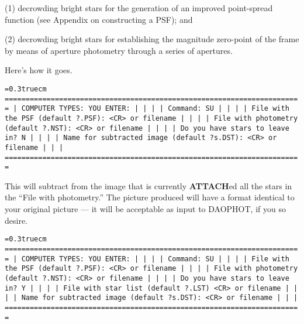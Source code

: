 \item{(1)} decrowding bright stars for the generation of an improved
point-spread function (see Appendix on constructing a PSF); and

\item{(2)} decrowding bright stars for establishing the magnitude
zero-point of the frame by means of aperture photometry through a
series of apertures.  

Here's how it goes.

\bigskip
{\noindent\obeylines\obeyspaces\frenchspacing\tt\baselineskip=0.3truecm
=======================================================================
| COMPUTER TYPES:                                  YOU ENTER:         |
|                                                                     |
| Command:                                         SU                 |
|                                                                     |
|             File with the PSF (default ?.PSF):   <CR> or filename   |
|                                                                     |
|          File with photometry (default ?.NST):   <CR> or filename   |
|                                                                     |
|                Do you have stars to leave in?    N                  |
|                                                                     |
|    Name for subtracted image (default ?s.DST):   <CR> or filename   |
|                                                                     |
=======================================================================
} 
\bigskip 

\noindent This will subtract from the image that is currently {\bf
ATTACH}ed all the stars in the ``File with photometry.''  The picture
produced will have a format identical to your original picture --- it
will be acceptable as input to DAOPHOT, if you so desire.

\vfill
\eject
{\noindent\obeylines\obeyspaces\frenchspacing\tt\baselineskip=0.3truecm
=======================================================================
| COMPUTER TYPES:                                  YOU ENTER:         |
|                                                                     |
| Command:                                         SU                 |
|                                                                     |
|             File with the PSF (default ?.PSF):   <CR> or filename   |
|                                                                     |
|          File with photometry (default ?.NST):   <CR> or filename   |
|                                                                     |
|                Do you have stars to leave in?    Y                  |
|                                                                     |
|           File with star list (default ?.LST)    <CR> or filename   |
|                                                                     |
|    Name for subtracted image (default ?s.DST):   <CR> or filename   |
|                                                                     |
=======================================================================
} 
\bigskip 

